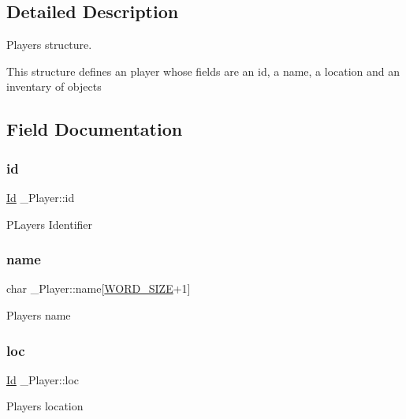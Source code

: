 \subsection{Detailed Description}
Player\textquotesingle{}s structure. 

This structure defines an player whose fields are an id, a name, a location and an inventary of objects 

\subsection{Field Documentation}
\mbox{\label{struct__Player_a60d635cd063816a9c1bd873f4868bb90}} 
\subsubsection{\texorpdfstring{id}{id}}
{\footnotesize\ttfamily \hyperlink{types_8h_a845e604fb28f7e3d97549da3448149d3}{Id} \+\_\+\+Player\+::id}

P\+Layer\textquotesingle{}s Identifier \mbox{\label{struct__Player_ac89715f913cc607b75eb7236765c41f5}} 
\subsubsection{\texorpdfstring{name}{name}}
{\footnotesize\ttfamily char \+\_\+\+Player\+::name\mbox{[}\hyperlink{types_8h_a92ed8507d1cd2331ad09275c5c4c1c89}{W\+O\+R\+D\+\_\+\+S\+I\+ZE}+1\mbox{]}}

Player\textquotesingle{}s name \mbox{\label{struct__Player_a40f39335ccf0d2de882b7588f1917e58}} 
\subsubsection{\texorpdfstring{loc}{loc}}
{\footnotesize\ttfamily \hyperlink{types_8h_a845e604fb28f7e3d97549da3448149d3}{Id} \+\_\+\+Player\+::loc}

Player\textquotesingle{}s location \mbox{\label{struct__Player_aaaeeb03326c37ce62c333c2b94fde23c}} 
